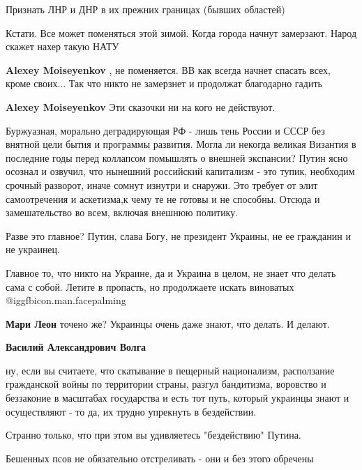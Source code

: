 \begin{itemize}
Признать ЛНР и ДНР в их прежних границах (бывших областей)

Кстати. Все может поменяться этой зимой. Когда города начнут замерзают. Народ скажет нахер такую НАТУ

\begin{itemize} %
\textbf{Alexey Moiseyenkov} , не поменяется. ВВ как всегда начнет спасать всех, кроме своих... Так что никто не замерзнет и продолжат благодарно гадить

\textbf{Alexey Moiseyenkov}
Эти сказочки ни на кого не действуют.

\end{itemize} %


Буржуазная, морально деградирующая РФ - лишь тень России и СССР без внятной
цели бытия и программы развития. Могла ли некогда великая Византия в последние
годы перед коллапсом помышлять о внешней экспансии? Путин ясно осознал и
озвучил, что нынешний российский капитализм - это тупик, необходим срочный
разворот, иначе сомнут изнутри и снаружи. Это требует от элит самоотречения и
аскетизма,к чему те не готовы и не способны. Отсюда и замешательство во всем,
включая внешнюю политику.


Разве это главное? Путин, слава Богу, не президент Украины, не ее гражданин и
не украинец.

Главное то, что никто на Украине, да и Украина в целом, не знает что делать
сама с собой. Летите в пропасть, но продолжаете искать виноватых  @igg{fbicon.man.facepalming} 

\begin{itemize} %
\textbf{Мари Леон} точено же? Украинцы очень даже знают, что делать. И делают.

\textbf{Василий Александрович Волга} 

ну, если вы считаете, что скатывание в пещерный национализм, расползание
гражданской войны по территории страны, разгул бандитизма, воровство и
беззаконие в масштабах государства и есть тот путь, который украинцы знают и
осуществляют - то да, их трудно упрекнуть в бездействии.

Странно только, что при этом вы удивляетесь "бездействию" Путина.

Бешенных псов не обязательно отстреливать - они и без этого обречены


\end{itemize}
\end{itemize}
